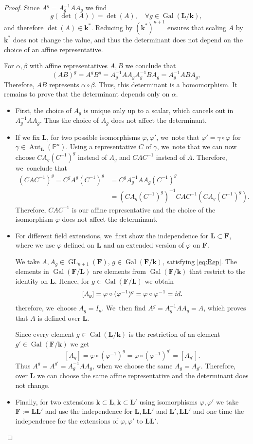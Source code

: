 \documentclass[10pt,a4paper]{amsart}
\newcommand{\id}{\textup{id}}
\DeclareMathOperator{\Gal}{Gal}
\theoremstyle{definition}
\newcommand{\kk}{{\boldsymbol{k}}}
\newcommand{\FF}{{\boldsymbol{F}}}
\newcommand{\LL}{{\boldsymbol{L}}}
\DeclareMathOperator{\GL}{GL}
\DeclareMathOperator{\Aut}{Aut}
\begin{document}
\begin{proof}
Since $A^g = A_g^{-1} A A_g$ we find
\[
g(\det(A)) = \det(A),\quad \forall g \in \Gal(\LL/\kk),
\]
and therefore $\det(A) \in \kk^*$. Reducing by $(\kk^*)^{n + 1}$ ensures that scaling $A$ by $\kk^*$ does not change the value, and thus the determinant does not depend on the choice of an affine representative.

For $\alpha, \beta$ with affine representatives $A,B$ we conclude that
\[
(AB)^g = A^g B^g = A_g^{-1}A A_g A_g^{-1} B A_g = A_g^{-1} AB A_g,
\]
Therefore, $AB$ represents $\alpha \circ \beta$. Thus, this determinant is a homomorphism. It remains to prove that the determinant depends only on $\alpha$.
\begin{itemize}
\item First, the choice of $A_g$ is unique only up to a scalar, which cancels out in $A_g^{-1} A A_g$. Thus the choice of $A_g$ does not affect the determinant.
\item If we fix $\LL$, for two possible isomorphisms $\varphi, \varphi'$, we~note that $\varphi' = \gamma \circ \varphi$ for $\gamma \in \Aut_{\LL}(\mathbb{P}^n)$. Using a representative $C$ of $\gamma$, we~note that we can now choose $C A_g (C^{-1})^g$ instead of $A_g$ and $CAC^{-1}$ instead of $A$. Therefore, we~conclude that
\begin{align*}
(CAC^{-1})^g = C^g A^g (C^{-1})^g&= C^g A_g^{-1} A A_g (C^{-1})^g
\\
&= (C A_g (C^{-1})^g)^{-1} CAC^{-1} (CA_g (C^{-1})^g).
\end{align*}
Therefore, $CAC^{-1}$ is our affine representative and the choice of the isomorphism $\varphi$ does not affect the determinant.
\item For different field extensions, we~first show the independence for $\LL \subset \FF$, where we use $\varphi$ defined on $\LL$ and an extended version of $\varphi$ on $\FF$.

We take $A, A_g \in \GL_{n + 1}(\FF)$, $g \in \Gal(\FF/\kk)$, satisfying \eqref{eq:Rep}. The elements in $\Gal(\FF/\LL)$ are elements from $\Gal(\FF/\kk)$ that restrict to the identity on $\LL$. Hence, for $g \in \Gal(\FF/\LL)$ we obtain
\[
[A_g] = \varphi \circ (\varphi^{-1})^g = \varphi \circ \varphi^{-1} = \id.
\]
therefore, we~choose $A_g = I_n$. We~then find $A^g = A_g^{-1} A A_g = A$, which proves that $A$ is defined over $\LL$.

Since every element $g \!\in\! \Gal(\LL/\kk)$ is the restriction of an element $g' \in \Gal(\FF/\kk)$ we get
\[
[A_g] = \varphi \circ (\varphi^{-1})^g = \varphi \circ (\varphi^{-1})^{g'} = [A_{g'}].
\]
Thus $A^g = A^{g'} = A_g^{-1} A A_g$, when we choose the same $A_g = A_{g'}$. Therefore, over $\LL$ we can choose the same affine representative and the determinant does not change.

\item Finally, for two extensions $\kk \subset \LL, \kk \subset \LL'$ using isomorphisms $\varphi, \varphi'$ we take $\FF:= \LL\LL'$ and use the independence for $\LL, \LL\LL'$ and $\LL', \LL\LL'$ and one time the independence for the extensions of $\varphi, \varphi'$ to $\LL\LL'$. \qedhere
\end{itemize}
\end{proof}
\end{document}
